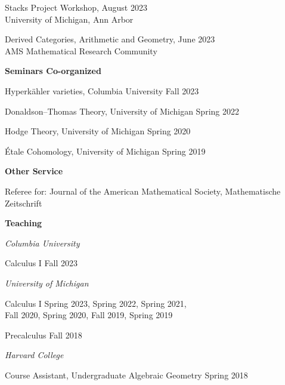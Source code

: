 \documentclass[11 pt]{letter}
\begin{document}
	Stacks Project Workshop, \hfill August 2023 \\
	\indent University of Michigan, Ann Arbor 

	Derived Categories, Arithmetic and Geometry, \hfill June 2023 \\
	\indent AMS Mathematical Research Community 


	
	\medskip
	\noindent
	\textbf{\large{Seminars Co-organized}}

	Hyperk\"ahler varieties, Columbia University \hfill Fall 2023

	Donaldson--Thomas Theory, University of Michigan \hfill Spring 2022

	Hodge Theory, University of Michigan \hfill Spring 2020

	\'Etale Cohomology, University of Michigan \hfill Spring 2019 

	

	\medskip
	\noindent
	\textbf{Other Service}

	Referee for: Journal of the American Mathematical Society, Mathematische Zeitschrift


	\medskip
	\noindent
	\textbf{\large{Teaching}}

	\noindent \emph{Columbia University}

	Calculus I \hfill Fall 2023


	\noindent \emph{University of Michigan}


	

	Calculus I \hfill Spring 2023, Spring 2022, Spring 2021, \\ 
	\null \hfill Fall 2020, Spring 2020, Fall 2019, Spring 2019



	Precalculus \hfill Fall 2018 


	\noindent \emph{Harvard College}

	Course Assistant, Undergraduate Algebraic Geometry \hfill Spring 2018



	









	

\end{document}
